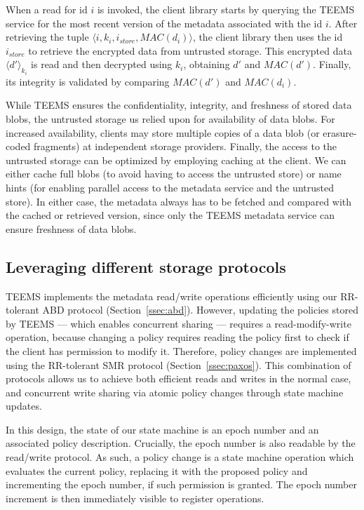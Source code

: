 When a read for id $i$ is invoked, the client library starts by
querying the \ac{TEEMS} service for the most recent version of
the metadata associated with the id $i$. After retrieving the
tuple $\langle i,k_i,i_{store},MAC(d_i) \rangle$, the client
library then uses the id $i_{store}$ to retrieve the encrypted
data from untrusted storage. This encrypted data $\langle
d'\rangle_{k_i}$ is read and then decrypted using $k_i$,
obtaining $d'$ and $MAC(d')$. Finally, its integrity  is
validated by comparing $MAC(d')$ and $MAC(d_i)$.

While \ac{TEEMS} ensures the confidentiality, integrity, and
freshness of stored data blobs, the untrusted storage us relied
upon for availability of data blobs. For increased availability,
clients may store multiple copies of a data blob (or
erasure-coded fragments) at independent storage providers.
%
Finally, the access to the untrusted storage can be optimized by
employing caching at the client. We can either cache full blobs (to
avoid having to access the untrusted store) or name hints (for
enabling parallel access to the metadata service and the untrusted
store).  In either case, the metadata always has to be fetched and
compared with the cached or retrieved version, since only the
\ac{TEEMS} metadata service can ensure freshness of data blobs.

\subsection{Leveraging different storage protocols}

\ac{TEEMS} implements the metadata read/write operations efficiently using
our \ac{RR}-tolerant ABD protocol (Section~\ref{ssec:abd}).  However,
updating the policies stored by \ac{TEEMS} --- which enables concurrent
 sharing --- requires a read-modify-write operation, because changing
a policy requires reading the policy first to check if the client has
permission to modify it.  Therefore, policy changes are implemented
using the \ac{RR}-tolerant SMR protocol
(Section~\ref{ssec:paxos}).  This combination of protocols allows us
to achieve both efficient reads and writes in the normal case, and
concurrent write sharing via atomic policy changes through state
machine updates.

In this design, the state of our state machine is an epoch number
and an associated policy description. Crucially, the
epoch number is also readable by the read/write protocol. As
such, a policy change is a state machine operation which
evaluates the current policy, replacing it with the proposed
policy and incrementing the epoch number, if such permission is
granted. The epoch number increment is then immediately
visible to register operations.

